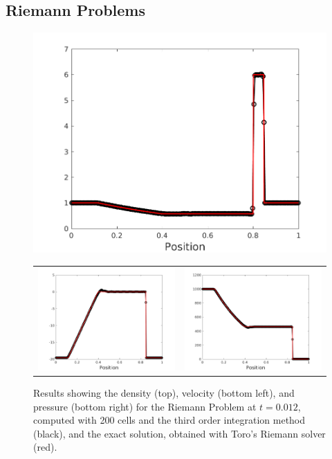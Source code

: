 \documentclass[10pt,preprint]{aastex}
\begin{document}
\subsection{Riemann Problems}

\begin{figure}[h]
  \begin{center}
     \includegraphics[width=.95\textwidth]{RiemannProblem_d5.png}
	\begin{tabular}{cc}
      \includegraphics[width=.475\textwidth]{RiemannProblem_v5.png} &
	  \includegraphics[width=.475\textwidth]{RiemannProblem_p5.png}
	\end{tabular}	
  \end{center}
  \caption{Results showing the density (top), velocity (bottom left), and pressure (bottom right) for the Riemann Problem at $t=0.012$, computed with 200 cells and the third order integration method (black), and the exact solution, obtained with Toro's Riemann solver (red).}
  \label{fig:Riemann}
\end{figure}
\end{document}
